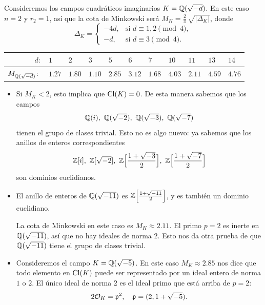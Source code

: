 \begin{ejemplo}
  Consideremos los campos cuadráticos imaginarios $K = \mathbb{Q} (\sqrt{-d})$.
  En este caso $n = 2$ y $r_2 = 1$, así que la cota de Minkowski será
  $M_K = \frac{2}{\pi}\,\sqrt{|\Delta_K|}$, donde
  \[ \Delta_K = \begin{cases}
    -4d, & \text{si }d \equiv 1,2\pmod{4},\\
    -d, & \text{si }d \equiv 3\pmod{4}.
  \end{cases} \]

  \begin{center}\renewcommand{\arraystretch}{1.5}
    \begin{tabular}{rx{1cm}x{1cm}x{1cm}x{1cm}x{1cm}x{1cm}x{1cm}x{1cm}x{1cm}x{1cm}}
      \hline
      $d\colon$ & $1$ & $2$ & $3$ & $5$ & $6$ & $7$ & $10$ & $11$ & $13$ & $14$ \tabularnewline
      \hline
      $M_{\mathbb{Q} (\sqrt{-d})}\colon$ & $1.27$ & $1.80$ & $1.10$ & $2.85$ & $3.12$ & $1.68$ & $4.03$ & $2.11$ & $4.59$ & $4.76$ \tabularnewline
      \hline
    \end{tabular}
  \end{center}

  \vspace{1em}

  \begin{itemize}
  \item Si $M_K < 2$, esto implica que $\operatorname{Cl} (K) = 0$. De esta manera sabemos que
    los campos
    $$\mathbb{Q} (i), ~ \mathbb{Q} (\sqrt{-2}), ~ \mathbb{Q} (\sqrt{-3}), ~ \mathbb{Q} (\sqrt{-7})$$
    tienen el grupo de clases trivial. Esto no es algo nuevo: ya sabemos que los
    anillos de enteros correspondientes
    \[ \mathbb{Z} [i], ~
       \mathbb{Z} [\sqrt{-2}], ~
       \mathbb{Z} \Bigl[\frac{1+\sqrt{-3}}{2}\Bigr], ~
       \mathbb{Z} \Bigl[\frac{1+\sqrt{-7}}{2}\Bigr] \]
    son dominios euclidianos.

  \item El anillo de enteros de $\mathbb{Q} (\sqrt{-11})$ es
    $\mathbb{Z} \Bigl[\frac{1+\sqrt{-11}}{2}\Bigr]$, y es también un dominio
    euclidiano.

    La cota de Minkowski en este caso es $M_K \approx 2.11$. El primo $p = 2$ es
    inerte en $\mathbb{Q} (\sqrt{-11})$, así que no hay ideales de norma $2$. Esto nos
    da otra prueba de que $\mathbb{Q} (\sqrt{-11})$ tiene el grupo de clases trivial.

  \item Consideremos el campo $K = \mathbb{Q} (\sqrt{-5})$. En este caso
    $M_K \approx 2.85$ nos dice que todo elemento en $\operatorname{Cl} (K)$ puede ser
    representado por un ideal entero de norma $1$ o $2$. El único ideal de norma
    $2$ es el ideal primo que está arriba de $p = 2$:
    $$2\mathcal{O}_K = \mathfrak{p}^2, \quad \mathfrak{p} = (2, 1 + \sqrt{-5}).$$


\end{itemize}
\end{ejemplo}
